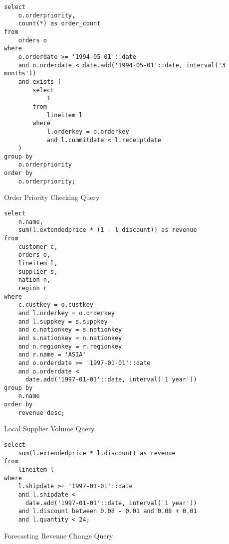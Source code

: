 \begin{listing}[!ht]
\begin{verbatim}
select
    o.orderpriority,
    count(*) as order_count
from
    orders o
where
    o.orderdate >= '1994-05-01'::date
    and o.orderdate < date.add('1994-05-01'::date, interval('3 months'))
    and exists (
        select
            1
        from
            lineitem l
        where
            l.orderkey = o.orderkey
            and l.commitdate < l.receiptdate
    )
group by
    o.orderpriority
order by
    o.orderpriority;
\end{verbatim}
\caption{Order Priority Checking Query}
\end{listing}

\begin{listing}[!ht]
\begin{verbatim}
select
    n.name,
    sum(l.extendedprice * (1 - l.discount)) as revenue
from
    customer c,
    orders o,
    lineitem l,
    supplier s,
    nation n,
    region r
where
    c.custkey = o.custkey
    and l.orderkey = o.orderkey
    and l.suppkey = s.suppkey
    and c.nationkey = s.nationkey
    and s.nationkey = n.nationkey
    and n.regionkey = r.regionkey
    and r.name = 'ASIA'
    and o.orderdate >= '1997-01-01'::date
    and o.orderdate <
      date.add('1997-01-01'::date, interval('1 year'))
group by
    n.name
order by
    revenue desc;
\end{verbatim}
\caption{Local Supplier Volume Query}
\end{listing}

\begin{listing}[!ht]
\begin{verbatim}
select
    sum(l.extendedprice * l.discount) as revenue
from
    lineitem l
where
    l.shipdate >= '1997-01-01'::date
    and l.shipdate <
      date.add('1997-01-01'::date, interval('1 year'))
    and l.discount between 0.08 - 0.01 and 0.08 + 0.01
    and l.quantity < 24;
\end{verbatim}
\caption{Forecasting Revenue Change Query}
\end{listing}

